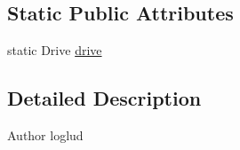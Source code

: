 \subsection*{Static Public Attributes}
\begin{DoxyCompactItemize}
\item 
static Drive \hyperlink{classCASUAL_1_1gDrive_1_1CASUALGDrive_ae4c31951e931fb6eeafc818873646451}{drive}
\end{DoxyCompactItemize}


\subsection{Detailed Description}
\begin{DoxyAuthor}{Author}
loglud 
\end{DoxyAuthor}



